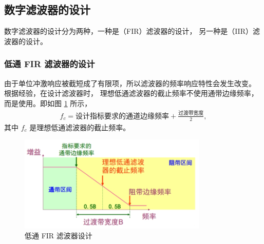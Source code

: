 \subsection{数字滤波器的设计}

数字滤波器的设计分为两种，一种是（FIR）滤波器的设计，
另一种是（IIR）滤波器的设计。

\subsubsection{低通 FIR 滤波器的设计}

由于单位冲激响应被截短成了有限项，所以滤波器的频率响应特性会发生改变。
根据经验，在设计滤波器时， 理想低通滤波器的截止频率不使用通带边缘频率，
而是使用。即如图 \ref{fig:low_pass_filter_fir} 所示，
\begin{align*}
    f_c = \text{设计指标要求的通道边缘频率} + \frac{\text{过渡带宽度}}{2},
\end{align*}
其中 $f_c$ 是理想低通滤波器的截止频率。

\begin{figure}[H]
    \centering
    \includegraphics[width=0.8\textwidth]{chap4/img/low_pass_filter_fir.png}
    \caption{低通 FIR 滤波器设计}
    \label{fig:low_pass_filter_fir}
\end{figure}

